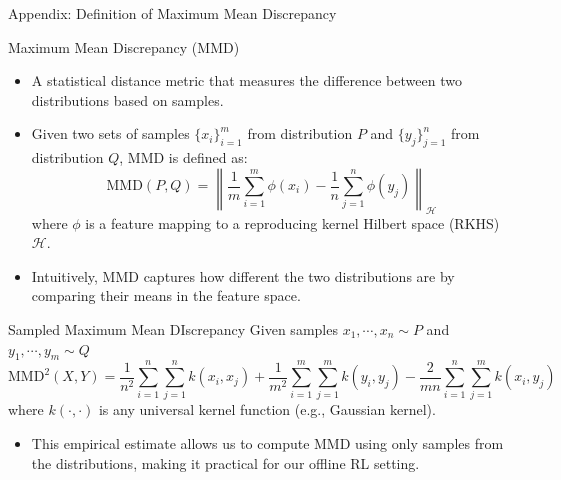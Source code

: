 \documentclass[11pt]{beamer}
\begin{document}
\begin{frame}{Appendix: Definition of Maximum Mean Discrepancy}
    \begin{block}{Maximum Mean Discrepancy (MMD)}
        \begin{itemize}
            \item A statistical distance metric that measures the difference between two distributions based on samples.
            \item Given two sets of samples $\{x_i\}_{i=1}^m$ from distribution $P$ and $\{y_j\}_{j=1}^n$ from distribution $Q$, MMD is defined as:
            \[
            \text{MMD}(P, Q) = \left\| \frac{1}{m} \sum_{i=1}^m \phi(x_i) - \frac{1}{n} \sum_{j=1}^n \phi(y_j) \right\|_{\mathcal{H}}
            \]
            where $\phi$ is a feature mapping to a reproducing kernel Hilbert space (RKHS) $\mathcal{H}$.
            \item Intuitively, MMD captures how different the two distributions are by comparing their means in the feature space.
        \end{itemize}
    \end{block}

    \begin{block}{Sampled Maximum Mean DIscrepancy}
        Given samples $x_1, \cdots, x_n \sim P$ and $y_1, \cdots, y_m \sim Q$
        \[
        \text{MMD}^2(X, Y) = \frac{1}{n^2} \sum_{i=1}^n \sum_{j=1}^n k(x_i, x_j) + \frac{1}{m^2} \sum_{i=1}^m \sum_{j=1}^m k(y_i, y_j) - \frac{2}{mn} \sum_{i=1}^n \sum_{j=1}^m k(x_i, y_j)
        \]
        where $k(\cdot,\cdot)$ is any universal kernel function (e.g., Gaussian kernel).
        \begin{itemize}
            \item This empirical estimate allows us to compute MMD using only samples from the distributions, making it practical for our offline RL setting.
        \end{itemize}
    \end{block}
\end{frame}
\end{document}

